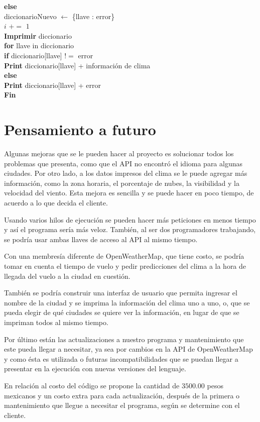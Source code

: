 \documentclass[]{article}
\begin{document}
\indent\indent\indent \textbf{else}\\
\indent\indent\indent\indent diccionarioNuevo $ \leftarrow $ \{llave : error\}
\\
\indent\indent\indent\indent $ i $ $ += $ $ 1 $\\
\indent\textbf{Imprimir} diccionario\\
\indent\indent \textbf{for} llave in diccionario\\
\indent\indent\indent \textbf{if} diccionario[llave] $ != $ error\\
\indent\indent\indent\indent \textbf{Print} diccionario[llave] + información 
de clima\\
\indent\indent\indent \textbf{else}\\
\indent\indent\indent\indent \textbf{Print} diccionario[llave] + error\\
\textbf{Fin}

\section{Pensamiento a futuro}
Algunas mejoras que se le pueden hacer al proyecto es solucionar todos los 
problemas que presenta, como que el API no encontró el idioma para algunas 
ciudades. Por otro lado, a los datos impresos del clima se le puede agregar 
más información, como la zona horaria, el porcentaje de nubes, la visibilidad 
y la velocidad del viento. Esta mejora es sencilla y se puede hacer en poco 
tiempo, de acuerdo a lo que decida el cliente.

Usando varios hilos de ejecución se pueden hacer más peticiones en menos 
tiempo y así el programa sería más veloz. También, al ser dos 
programadores trabajando, se podría usar ambas llaves de acceso al API al 
mismo tiempo.

Con una membresía diferente de OpenWeatherMap, que tiene costo, se 
podría tomar en cuenta el tiempo de vuelo y pedir predicciones del clima a la 
hora de llegada del vuelo a la ciudad en cuestión.

También se podría construir una interfaz de usuario que permita ingresar 
el nombre de la ciudad y se imprima la información del clima uno a uno, o, 
que se pueda elegir de qué ciudades se quiere ver la información, en lugar de 
que se impriman todos al mismo tiempo.

Por último están las actualizaciones a nuestro programa y mantenimiento 
que este pueda llegar a necesitar, ya sea por cambios en la API de 
OpenWeatherMap y como ésta es utilizada o futuras incompatibilidades que 
se puedan llegar a presentar en la ejecución con nuevas versiones del 
lenguaje.

En relación al costo del código se propone la cantidad de $ 3500.00 $ pesos 
mexicanos y un costo extra para cada actualización, después de la primera o 
mantenimiento que llegue a necesitar el programa, según se determine con 
el cliente.
\end{document}
